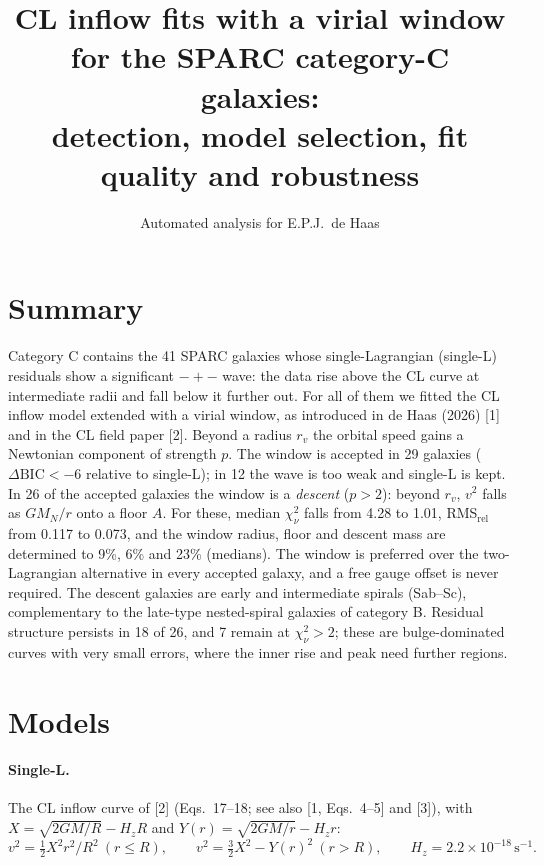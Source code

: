 \documentclass[10pt]{article}
\title{\bfseries CL inflow fits with a virial window for the SPARC category-C galaxies:\\ detection, model selection, fit quality and robustness}
\author{Automated analysis for E.P.J.\ de Haas}\date{}
\begin{document}
\maketitle
\section*{Summary}
Category C contains the 41 SPARC galaxies whose single-Lagrangian (single-L) residuals show a significant $-+-$ wave: the data rise above the CL curve at intermediate radii and fall below it further out. For all of them we fitted the CL inflow model extended with a virial window, as introduced in de Haas (2026) [1] and in the CL field paper [2]. Beyond a radius $r_v$ the orbital speed gains a Newtonian component of strength $p$. The window is accepted in 29 galaxies ($\Delta\mathrm{BIC}<-6$ relative to single-L); in 12 the wave is too weak and single-L is kept. In 26 of the accepted galaxies the window is a \emph{descent} ($p>2$): beyond $r_v$, $v^2$ falls as $GM_N/r$ onto a floor $A$. For these, median $\chi^2_\nu$ falls from 4.28 to 1.01, RMS$_\mathrm{rel}$ from 0.117 to 0.073, and the window radius, floor and descent mass are determined to 9\%, 6\% and 23\% (medians). The window is preferred over the two-Lagrangian alternative in every accepted galaxy, and a free gauge offset is never required. The descent galaxies are early and intermediate spirals (Sab--Sc), complementary to the late-type nested-spiral galaxies of category B. Residual structure persists in 18 of 26, and 7 remain at $\chi^2_\nu>2$; these are bulge-dominated curves with very small errors, where the inner rise and peak need further regions.

\section{Models}
\paragraph{Single-L.} The CL inflow curve of [2] (Eqs.~17--18; see also [1, Eqs.~4--5] and [3]), with $X=\sqrt{2GM/R}-H_zR$ and $Y(r)=\sqrt{2GM/r}-H_zr$:
\begin{equation*}v^2=\tfrac12X^2r^2/R^2\ (r\le R),\qquad v^2=\tfrac32X^2-Y(r)^2\ (r>R),\qquad H_z=2.2\times10^{-18}\,\mathrm{s^{-1}}.\end{equation*}
\end{document}

